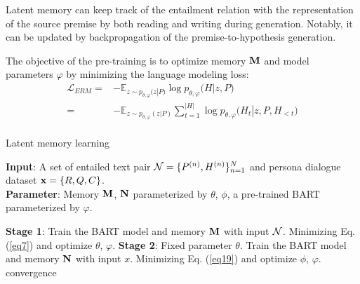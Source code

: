 \documentclass[letterpaper]{article} \usepackage{aaai23}  \usepackage{times}  \usepackage{helvet}  \usepackage{courier}  \usepackage[hyphens]{url}  \usepackage{graphicx} \urlstyle{rm} \def\UrlFont{\rm}  \usepackage{natbib}  \usepackage{caption} \frenchspacing  \setlength{\pdfpagewidth}{8.5in}  \setlength{\pdfpageheight}{11in}  \usepackage{algorithm}
\begin{document}
Latent memory can keep track of the entailment relation with the representation of the source premise by both reading and writing during generation. Notably, it can be updated by backpropagation of the premise-to-hypothesis generation.

The objective of the pre-training is to optimize memory ${\bf{M}}$ and model parameters $\varphi$ by minimizing the language modeling loss:
\begin{equation}
\begin{aligned}
  {\mathcal{L}_{ERM}} =  &  - {{\mathbb{E}}_{z \sim {p_{\theta ,\varphi }}(z\left| P) \right.}}\log {p_{\theta ,\varphi }}(H\left| {z,P)} \right. \\ 
   =  &  - {{\mathbb{E}}_{z \sim {p_{\theta ,\varphi }}(z\left| P \right.)}}\sum\limits_{t = 1}^{\left| H \right|} {\log {p_{\theta ,\varphi }}({H_t}\left| {z,P,{H_{ < t}})} \right.}  \\ 
\end{aligned}
\label{eq7}
\end{equation}

\begin{algorithm}[tb]
\caption{Latent memory learning}
\label{alg:algorithm1}
\textbf{Input}: A set of entailed text pair ${\cal N} = \{ {P^{(n)}},{H^{(n)}}\} _{n = 1}^N$ and persona dialogue dataset ${\bf{x}} = \{ R,Q,C\} $.\\
\textbf{Parameter}: Memory ${\bf{M}}$, ${\bf{N}}$ parameterized by $\theta$, $\phi$, a pre-trained BART parameterized by $\varphi$.
\begin{algorithmic}[1] \REPEAT
\STATE \textbf{Stage 1}:
\STATE Train the BART model and memory ${\bf{M}}$ with input  ${\cal N}$.
\STATE Minimizing Eq. (\ref{eq7}) and optimize $\theta$, $\varphi$.
\STATE \textbf{Stage 2}:
\STATE Fixed parameter $\theta $.
\STATE Train the BART model and memory ${\bf{N}}$ with input $x$.
\STATE Minimizing Eq. (\ref{eq19}) and optimize  $\phi$, $\varphi$.
\UNTIL convergence
\end{algorithmic}
\end{algorithm}
\end{document}
